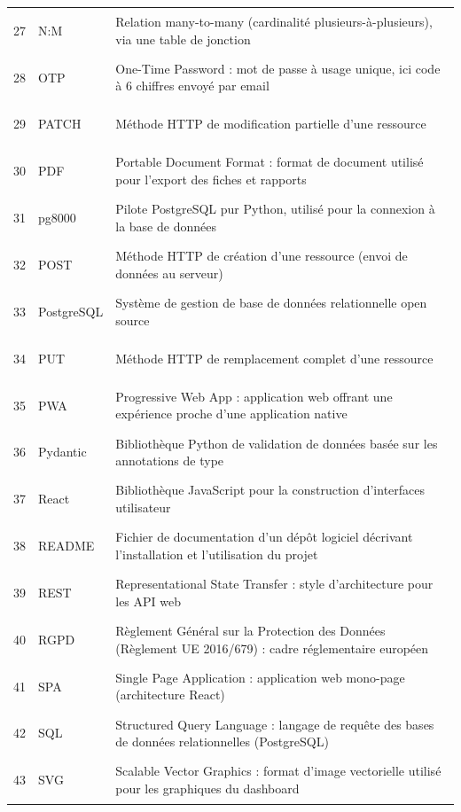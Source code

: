 \documentclass[12pt,a4paper]{report}
\begin{document}
\begin{longtable}{@{} l l >{\RaggedRight\arraybackslash}p{12.0cm} @{}}
\hypertarget{abbr-NM}{27} & N:M & Relation many-to-many (cardinalité plusieurs-à-plusieurs), via une table de jonction \\
\hypertarget{abbr-OTP}{28} & OTP & One-Time Password : mot de passe à usage unique, ici code à 6 chiffres envoyé par email \\
\hypertarget{abbr-PATCH}{29} & PATCH & Méthode HTTP de modification partielle d'une ressource \\
\hypertarget{abbr-PDF}{30} & PDF & Portable Document Format : format de document utilisé pour l'export des fiches et rapports \\
\hypertarget{abbr-pg8000}{31} & pg8000 & Pilote PostgreSQL pur Python, utilisé pour la connexion à la base de données \\
\hypertarget{abbr-POST}{32} & POST & Méthode HTTP de création d'une ressource (envoi de données au serveur) \\
\hypertarget{abbr-PostgreSQL}{33} & PostgreSQL & Système de gestion de base de données relationnelle open source \\
\hypertarget{abbr-PUT}{34} & PUT & Méthode HTTP de remplacement complet d'une ressource \\
\hypertarget{abbr-PWA}{35} & PWA & Progressive Web App : application web offrant une expérience proche d'une application native \\
\hypertarget{abbr-Pydantic}{36} & Pydantic & Bibliothèque Python de validation de données basée sur les annotations de type \\
\hypertarget{abbr-React}{37} & React & Bibliothèque JavaScript pour la construction d'interfaces utilisateur \\
\hypertarget{abbr-README}{38} & README & Fichier de documentation d'un dépôt logiciel décrivant l'installation et l'utilisation du projet \\
\hypertarget{abbr-REST}{39} & REST & Representational State Transfer : style d'architecture pour les API web \\
\hypertarget{abbr-RGPD}{40} & RGPD & Règlement Général sur la Protection des Données (Règlement UE 2016/679) : cadre réglementaire européen \\
\hypertarget{abbr-SPA}{41} & SPA & Single Page Application : application web mono-page (architecture React) \\
\hypertarget{abbr-SQL}{42} & SQL & Structured Query Language : langage de requête des bases de données relationnelles (PostgreSQL) \\
\hypertarget{abbr-SVG}{43} & SVG & Scalable Vector Graphics : format d'image vectorielle utilisé pour les graphiques du dashboard \\

\end{longtable}
\end{document}
